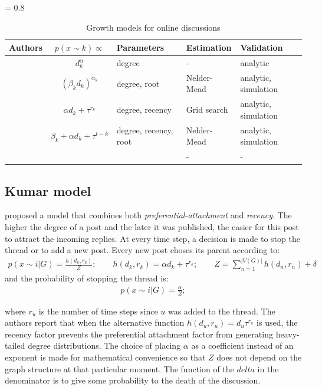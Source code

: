 \documentclass[smallextended]{svjour3}          %
\begin{document}
\begin{table}
 \begin{center}
   \tabcolsep = 0.8\tabcolsep
   \begin{tabular}{|l|c|l|l|l|}
      \hline
     	 Authors				& $p(x \sim k) \propto$ &Parameters & Estimation & Validation\\
   \hline 
\cite{Barabasi1999} & $d_k^\alpha$  & degree & - &  analytic\\
\cite{Gomez2010} & $(\beta_k d_{k})^{\alpha_k}$ & degree, root & Nelder-Mead & analytic, simulation\\
\cite{Kumar2010} & $\alpha d_k + \tau^{r_k}$ & degree, recency & Grid search &  analytic, simulation \\      
\cite{Gomez2012} & $\beta_k + \alpha d_k + \tau^{t-k}$ & degree, recency, root & Nelder-Mead &  analytic, simulation\\
\cite{Wang2012e} & & &- & -\\
   \hline
   \end{tabular}
\label{tab:growth_models}
 \end{center}
 \caption{Growth models for online discussions}
\end{table}

\subsection{Kumar model}
\cite{Kumar2010} proposed a model that combines both \textit{preferential-attachment} and \textit{recency}. The higher the degree of a post and the later it was published, the easier for this post to attract the incoming replies. At every time step, a decision is made to stop the thread or to add a new post. Every new post choses its parent according to:
\begin{align}
p(x\sim i | G) = \frac{h(d_k, r_k)}{Z}; \qquad h(d_k, r_k) =\alpha d_k + \tau^{r_k} ; \qquad Z = \sum_{n=1}^{|V(G)|} h(d_n, r_n) + \delta
\end{align}
and the probability of stopping the thread is:
\begin{align}
p(x\sim i | G) = \frac{\alpha}{Z}; 
\end{align}



where $r_u$ is the number of time steps since $u$ was added to the thread. The authors report that when the alternative function $h(d_u, r_u) = d_u \tau^{r_u}$ is used, the recency factor prevents the preferential attachment factor from generating heavy-tailed degree distributions. The choice of placing $\alpha$ as a coefficient instead of an exponent is made for mathematical convenience so that $Z$ does not depend on the graph structure at that particular moment. The function of the $delta$ in the denominator is to give some probability to the death of the discussion. 
\end{document}
